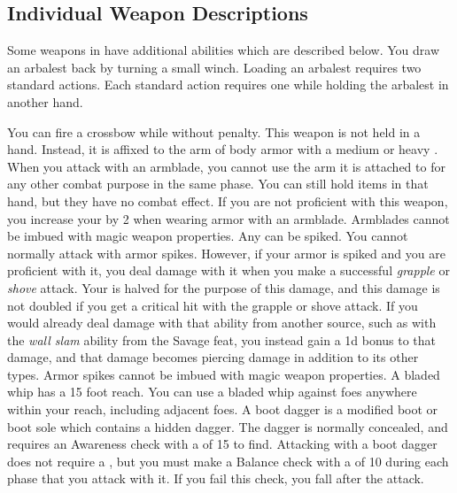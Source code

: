     \subsection{Individual Weapon Descriptions}
        Some weapons in  have additional abilities which are described below.
         You draw an arbalest back by turning a small winch. Loading an arbalest requires two standard actions.
        Each standard action requires one  while holding the arbalest in another hand.
        \par You can fire a crossbow while \prone without penalty.
         This weapon is not held in a hand.
        Instead, it is affixed to the arm of body armor with a medium or heavy .
        When you attack with an armblade, you cannot use the arm it is attached to for any other combat purpose in the same phase.
        You can still hold items in that hand, but they have no combat effect.
        If you are not proficient with this weapon, you increase your  by 2 when wearing armor with an armblade.
        Armblades cannot be imbued with magic weapon properties.
         Any  can be spiked.
        You cannot normally attack with armor spikes.
        However, if your armor is spiked and you are proficient with it, you deal damage with it when you make a successful \textit{grapple} or \textit{shove} attack.
        Your  is halved for the purpose of this damage, and this damage is not doubled if you get a critical hit with the grapple or shove attack.
        If you would already deal damage with that ability from another source, such as with the \textit{wall slam} ability from the Savage feat, you instead gain a \plus1d bonus to that damage, and that damage becomes piercing damage in addition to its other types.
        Armor spikes cannot be imbued with magic weapon properties.
         A bladed whip has a 15 foot reach.
        You can use a bladed whip against foes anywhere within your reach, including adjacent foes.
         A boot dagger is a modified boot or boot sole which contains a hidden dagger.
        The dagger is normally concealed, and requires an Awareness check with a  of 15 to find.
        Attacking with a boot dagger does not require a , but you must make a Balance check with a  of 10 during each phase that you attack with it.
        If you fail this check, you fall \prone after the attack.

